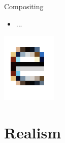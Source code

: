 \documentclass{lug}
\newcommand{\splitslide}[4]{
    \noindent
    \begin{minipage}{#1 \textwidth - #2 }
        #3
    \end{minipage}%
    \hspace{ \dimexpr #2 * 2 \relax }%
    \begin{minipage}{\textwidth - #1 \textwidth - #2 }
        #4
    \end{minipage}
}
\begin{document}
\begin{frame}{Compositing}
    \splitslide{0.65}{.7em}{
        \small
        \begin{itemize}
            \item ...
        \end{itemize}
    }{
        \includegraphics[width=\textwidth]{graphics/subpixel_e}
    }
    \noindent
\end{frame}

\section{Realism}
\end{document}
